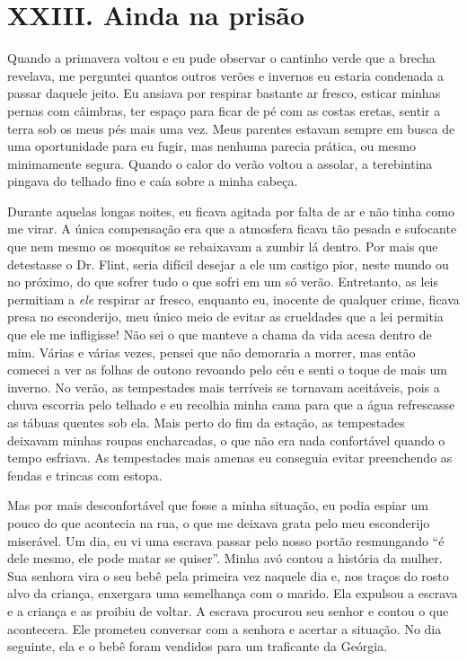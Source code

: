 \chapter{XXIII. Ainda na prisão}

Quando a primavera voltou e eu pude
observar o cantinho verde que a brecha revelava, me perguntei quantos
outros verões e invernos eu estaria condenada a passar daquele jeito. Eu
ansiava por respirar bastante ar fresco, esticar minhas pernas com
câimbras, ter espaço para ficar de pé com as costas eretas, sentir a
terra sob os meus pés mais uma vez. Meus parentes estavam sempre em
busca de uma oportunidade para eu fugir, mas nenhuma parecia prática, ou
mesmo minimamente segura. Quando o calor do verão voltou a assolar, a
terebintina pingava do telhado fino e caía sobre a minha cabeça.

Durante aquelas longas noites, eu
ficava agitada por falta de ar e não tinha como me virar. A única
compensação era que a atmosfera ficava tão pesada e sufocante que nem
mesmo os mosquitos se rebaixavam a zumbir lá dentro. Por mais que
detestasse o Dr. Flint, seria difícil desejar a ele um castigo pior,
neste mundo ou no próximo, do que sofrer tudo o que sofri em um só
verão. Entretanto, as leis permitiam a \emph{ele} respirar ar fresco,
enquanto eu, inocente de qualquer crime, ficava presa no esconderijo,
meu único meio de evitar as crueldades que a lei permitia que ele me
infligisse! Não sei o que manteve a chama da vida acesa dentro de mim.
Várias e várias vezes, pensei que não demoraria a morrer, mas então
comecei a ver as folhas de outono revoando pelo céu e senti o toque de
mais um inverno. No verão, as tempestades mais terríveis se tornavam
aceitáveis, pois a chuva escorria pelo telhado e eu recolhia minha cama
para que a água refrescasse as tábuas quentes sob ela. Mais perto do fim
da estação, as tempestades deixavam minhas roupas encharcadas, o que não
era nada confortável quando o tempo esfriava. As tempestades mais amenas
eu conseguia evitar preenchendo as fendas e trincas com estopa.

Mas por mais desconfortável que fosse a
minha situação, eu podia espiar um pouco do que acontecia na rua, o que
me deixava grata pelo meu esconderijo miserável. Um dia, eu vi uma
escrava passar pelo nosso portão resmungando ``é dele mesmo, ele pode
matar se quiser''. Minha avó contou a história da mulher. Sua senhora
vira o seu bebê pela primeira vez naquele dia e, nos traços do rosto
alvo da criança, enxergara uma semelhança com o marido. Ela expulsou a
escrava e a criança e as proibiu de voltar. A escrava procurou seu
senhor e contou o que acontecera. Ele prometeu conversar com a senhora e
acertar a situação. No dia seguinte, ela e o bebê foram vendidos para um
traficante da Geórgia.

